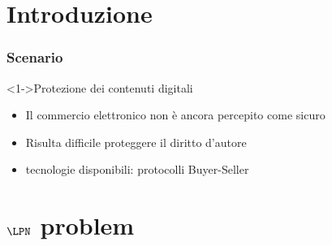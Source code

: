\section{Introduzione}
\begin{frame}
 \frametitle{Scenario}
   \begin{block}<1->{Protezione dei contenuti digitali}
    \begin{itemize}
     \item Il commercio elettronico non è ancora percepito come sicuro
     \item Risulta difficile proteggere il diritto d'autore
     \item tecnologie disponibili: protocolli Buyer-Seller
    \end{itemize}
   \end{block}
\end{frame}

\section{$\LPN$ problem}

\section{$$}
